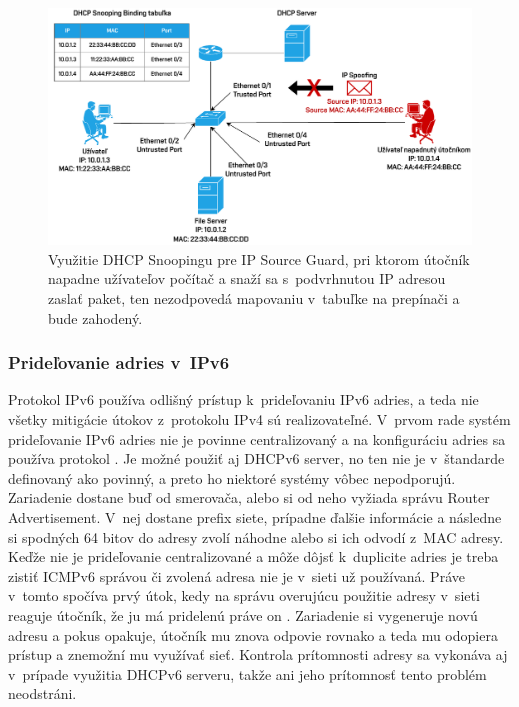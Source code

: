 \begin{figure}[H]
	\begin{center}
		\includegraphics[scale=0.75]{obrazky/dhcp-snoop.pdf}
	\end{center}
	\caption[DHCP Snooping a IP Source Guard]{Využitie DHCP Snoopingu pre IP Source Guard, pri ktorom útočník napadne užívateľov počítač a snaží sa s~podvrhnutou IP adresou zaslať paket, ten nezodpovedá mapovaniu v~tabuľke na prepínači a bude zahodený.}
	\label{fig:dhcpsnoop}
\end{figure}    

\subsubsection{Prideľovanie adries v~IPv6}
Protokol IPv6 používa odlišný prístup k~prideľovaniu IPv6 adries, a teda nie všetky mitigácie útokov z~protokolu IPv4 sú realizovateľné. V~prvom rade systém prideľovanie IPv6 adries nie je povinne centralizovaný a na konfiguráciu adries sa používa protokol . Je možné použiť aj DHCPv6 server, no ten nie je v~štandarde definovaný ako povinný, a preto ho niektoré systémy vôbec nepodporujú. Zariadenie dostane buď od smerovača, alebo si od neho  vyžiada správu Router Advertisement. V~nej dostane prefix siete, prípadne ďalšie informácie a následne si spodných 64 bitov do adresy zvolí náhodne alebo si ich odvodí z~MAC adresy. Keďže nie je prideľovanie centralizované a môže dôjsť k~duplicite adries je treba zistiť ICMPv6 správou či zvolená adresa nie je v~sieti už používaná. Práve v~tomto spočíva prvý útok, kedy na správu overujúcu použitie adresy v~sieti reaguje útočník, že ju má pridelenú práve on \cite{Hg83oflOfHBGeWfs}. Zariadenie si vygeneruje novú adresu a pokus opakuje, útočník mu znova odpovie rovnako a teda mu odopiera prístup a znemožní mu využívať sieť. Kontrola prítomnosti adresy sa vykonáva aj v~prípade využitia DHCPv6 serveru, takže ani jeho prítomnosť tento problém neodstráni. 

